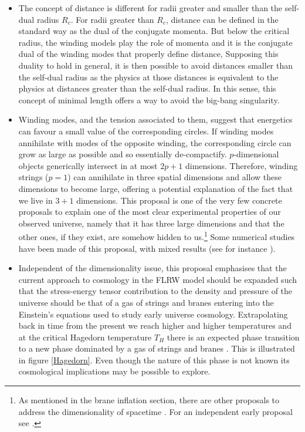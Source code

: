 \begin{itemize}
\item
The concept of distance is different for radii greater and smaller than the self-dual radius $R_c$. For radii greater than $R_c$, distance can be defined in the standard way as the dual of the conjugate momenta. But below the critical radius, the winding models play the role of momenta and it is the conjugate dual of the winding modes that properly define distance,
Supposing this duality to hold in general, it is then possible to avoid distances smaller than the self-dual radius as the physics at those distances is equivalent to the physics at distances greater than the self-dual radius. In this sense, this concept of minimal length offers a way to avoid the big-bang singularity.
\item
Winding modes, and the tension associated to them, suggest that energetics can favour a small value of the corresponding circles. If winding modes annihilate with modes of the opposite winding, the corresponding circle can grow as large as possible and so essentially de-compactify. $p$-dimensional objects generically intersect in at most $2p+1$ dimensions. Therefore, winding strings ($p=1$) can annihilate in three spatial dimensions and allow these dimensions to become large, offering a potential explanation of the fact that we live in $3+1$ dimensions. This proposal is one of the very few concrete proposals to explain one of the most clear experimental properties of our observed universe, namely that it has three large dimensions and that the other ones, if they exist, are somehow hidden to us.\footnote{As mentioned in the brane inflation section, there are other proposals to address the dimensionality of spacetime \cite{Burgess:2001fx,Karch:2005yz, Durrer:2005nz}. For an independent  early proposal see \cite{Gibbons:1986uu}. } Some numerical studies have been made of this proposal, with mixed results (see for instance \cite{Sakellariadou:1995vk,Greene:2009gp,Greene:2012sa}).

\item
Independent of the dimensionality issue, this proposal emphasises that the current approach to cosmology in the FLRW model should be expanded such that the stress-energy tensor contribution to the density and pressure of the universe  should be that of a gas of strings and branes entering into the Einstein's equations used to study early universe cosmology. Extrapolating back in time from the present we reach higher and higher temperatures and at the critical Hagedorn temperature $T_H$ there is an expected  phase transition to a new phase dominated by a gas of  strings and branes \cite{Battefeld:2005av,Brandenberger:2006vv, Alexander:2000xv, Easther:2002qk, Easther:2003dd}. This is 
illustrated in figure \ref{Hagedorn}. Even though the nature of this phase is not known its cosmological implications may be possible to explore. 
\end{itemize}

